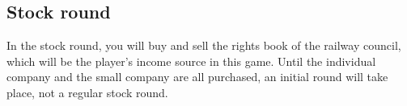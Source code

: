 \documentclass{article}
\begin{document}
\begin{CJK}{UTF8}{min}












\section{Stock round}
In the stock round, you will buy and sell the rights book of the
railway council, which will be the player's income source in this
game. Until the individual company and the small company are all
purchased, an initial round will take place, not a regular stock
round.


\end{CJK}
\end{document}
